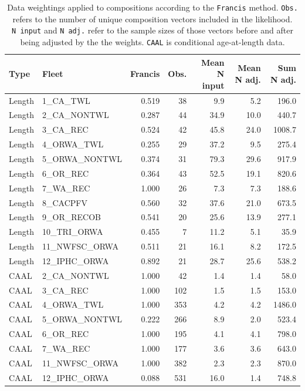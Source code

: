 \documentclass[
  english,
]{article}
\begin{document}
\begin{longtable}{llrrrrr}

\caption{\label{tbl-compweight}Data weightings applied to compositions
according to the \texttt{Francis} method. \texttt{Obs.} refers to the
number of unique composition vectors included in the likelihood.
\texttt{N\ input} and \texttt{N\ adj.} refer to the sample sizes of
those vectors before and after being adjusted by the the weights.
\texttt{CAAL} is conditional age-at-length data.}

\tabularnewline

\toprule
Type & Fleet & Francis & Obs. & Mean N input & Mean N adj. & Sum N adj. \\ 
\midrule\addlinespace[2.5pt]
Length & 1\_CA\_TWL & 0.519 & 38 & 9.9 & 5.2 & 196.0 \\ 
Length & 2\_CA\_NONTWL & 0.287 & 44 & 34.9 & 10.0 & 440.7 \\ 
Length & 3\_CA\_REC & 0.524 & 42 & 45.8 & 24.0 & 1008.7 \\ 
Length & 4\_ORWA\_TWL & 0.255 & 29 & 37.2 & 9.5 & 275.4 \\ 
Length & 5\_ORWA\_NONTWL & 0.374 & 31 & 79.3 & 29.6 & 917.9 \\ 
Length & 6\_OR\_REC & 0.364 & 43 & 52.5 & 19.1 & 820.6 \\ 
Length & 7\_WA\_REC & 1.000 & 26 & 7.3 & 7.3 & 188.6 \\ 
Length & 8\_CACPFV & 0.560 & 32 & 37.6 & 21.0 & 673.5 \\ 
Length & 9\_OR\_RECOB & 0.541 & 20 & 25.6 & 13.9 & 277.1 \\ 
Length & 10\_TRI\_ORWA & 0.455 & 7 & 11.2 & 5.1 & 35.9 \\ 
Length & 11\_NWFSC\_ORWA & 0.511 & 21 & 16.1 & 8.2 & 172.5 \\ 
Length & 12\_IPHC\_ORWA & 0.892 & 21 & 28.7 & 25.6 & 538.2 \\ 
CAAL & 2\_CA\_NONTWL & 1.000 & 42 & 1.4 & 1.4 & 58.0 \\ 
CAAL & 3\_CA\_REC & 1.000 & 102 & 1.5 & 1.5 & 153.0 \\ 
CAAL & 4\_ORWA\_TWL & 1.000 & 353 & 4.2 & 4.2 & 1486.0 \\ 
CAAL & 5\_ORWA\_NONTWL & 0.222 & 266 & 8.9 & 2.0 & 523.4 \\ 
CAAL & 6\_OR\_REC & 1.000 & 195 & 4.1 & 4.1 & 798.0 \\ 
CAAL & 7\_WA\_REC & 1.000 & 177 & 3.6 & 3.6 & 643.0 \\ 
CAAL & 11\_NWFSC\_ORWA & 1.000 & 382 & 2.3 & 2.3 & 870.0 \\ 
CAAL & 12\_IPHC\_ORWA & 0.088 & 531 & 16.0 & 1.4 & 748.8 \\ 
\bottomrule

\end{longtable}
\end{document}
